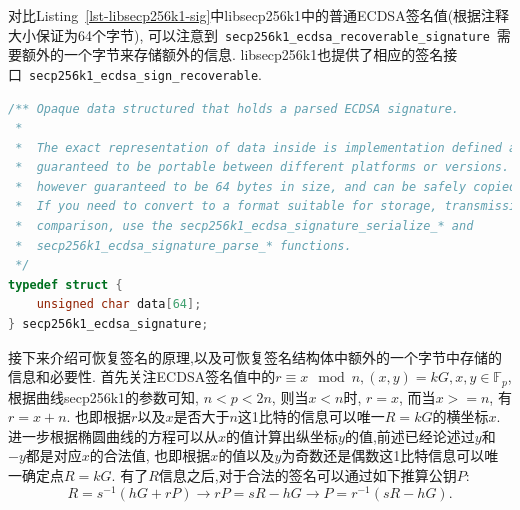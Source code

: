 \documentclass{article}
\newcommand{\F}{\mathbb{F}}
\newcommand{\code}[1]{\lstinline!#1!}
\begin{document}
对比Listing~\ref{lst-libsecp256k1-sig}中libsecp256k1中的普通ECDSA签名值(根据注释大小保证为64个字节),
可以注意到~\code{secp256k1_ecdsa_recoverable_signature}~需要额外的一个字节来存储额外的信息.
libsecp256k1也提供了相应的签名接口~\code{secp256k1_ecdsa_sign_recoverable}.

\begin{lstlisting}[language=c, caption = libsecp256k1中的\textsf{secp256k1_ecdsa_signature}, label=lst-libsecp256k1-sig]
/** Opaque data structured that holds a parsed ECDSA signature.
 *
 *  The exact representation of data inside is implementation defined and not
 *  guaranteed to be portable between different platforms or versions. It is
 *  however guaranteed to be 64 bytes in size, and can be safely copied/moved.
 *  If you need to convert to a format suitable for storage, transmission, or
 *  comparison, use the secp256k1_ecdsa_signature_serialize_* and
 *  secp256k1_ecdsa_signature_parse_* functions.
 */
typedef struct {
    unsigned char data[64];
} secp256k1_ecdsa_signature;
\end{lstlisting}

接下来介绍可恢复签名的原理,以及可恢复签名结构体中额外的一个字节中存储的信息和必要性.
首先关注ECDSA签名值中的$r \equiv x \mod n, (x, y) = kG, x, y \in \F_p$, 根据曲线secp256k1的参数可知,
$n < p < 2n$, 则当$x < n$时, $r = x$, 而当$x >= n$, 有$r = x + n$. 
也即根据$r$以及$x$是否大于$n$这1比特的信息可以唯一$R = kG$的横坐标$x$.
进一步根据椭圆曲线的方程可以从$x$的值计算出纵坐标$y$的值,前述已经论述过$y$和$-y$都是对应$x$的合法值,
也即根据$x$的值以及$y$为奇数还是偶数这1比特信息可以唯一确定点$R = kG$.
有了$R$信息之后,对于合法的签名可以通过如下推算公钥$P$:
$$
R = s^{-1}(hG+rP) \rightarrow rP = sR - hG \rightarrow P = r^{-1}(sR-hG).
$$
\end{document}
